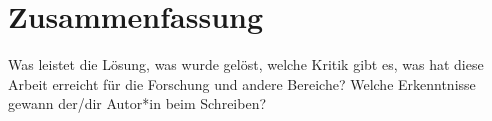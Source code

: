 \chapter{Zusammenfassung}
	
Was leistet die Lösung, was wurde gelöst, welche Kritik gibt es, was hat diese Arbeit erreicht für die Forschung und andere Bereiche? Welche Erkenntnisse gewann der/dir Autor*in beim Schreiben?